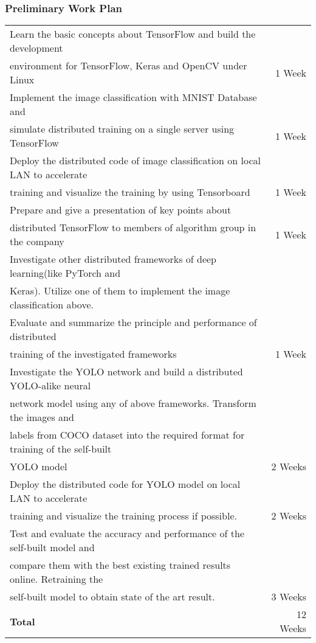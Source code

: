 \documentclass[12pt,a4paper]{article}
\begin{document}
	\subsubsection{Preliminary Work Plan}
	\begin{tabular}{l|r}
		\hline
		Learn the basic concepts about TensorFlow and build the development \\ environment for TensorFlow, Keras and OpenCV under Linux & 1 Week \\
		\hline
		Implement the image classification with MNIST Database and \\ simulate distributed training on a single server using TensorFlow & 1 Week \\
		\hline
		Deploy the distributed code of image classification on local LAN to accelerate\\ training  and visualize  the training by using Tensorboard & 1 Week \\
		\hline
		Prepare and give a presentation of key  points about \\distributed TensorFlow to members of algorithm group in the company & 1 Week \\
		\hline
		Investigate other distributed  frameworks of deep learning(like PyTorch and \\Keras). Utilize one of them to implement the image classification above. \\Evaluate and summarize the principle and performance of distributed\\training of the investigated frameworks & 1 Week\\
		\hline
		Investigate the YOLO network and build a distributed YOLO-alike neural \\ network model using any of above frameworks. Transform the images and \\labels from COCO dataset into the required format for training of the self-built \\ YOLO model & 2 Weeks\\
		\hline
		Deploy the distributed code for YOLO model on local LAN to accelerate \\training and visualize the training process if possible. & 2 Weeks\\
		\hline
		Test and evaluate the accuracy and  performance of the self-built model and\\ compare them with the best existing trained results online. Retraining the\\ self-built model to obtain state of the art result. & 3 Weeks\\
		\hline 
		\textbf{Total} & 12 Weeks
	\end{tabular}
\end{document}
